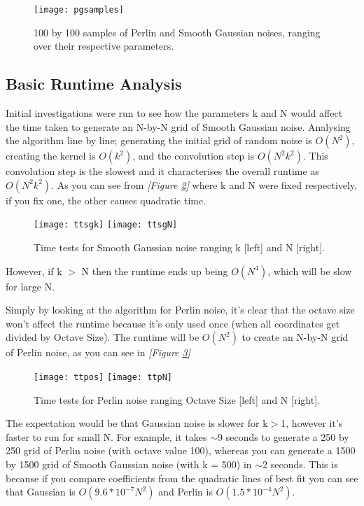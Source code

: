 \documentclass[11pt,a4paper]{article}
\begin{document}
\begin{figure}[h]
	\centering
	\texttt{[image: pgsamples]}
	\caption{100 by 100 samples of Perlin and Smooth Gaussian noises, ranging over their respective parameters.}
	\label{fig:pgsamples}
\end{figure}

\subsection{Basic Runtime Analysis}

Initial investigations were run to see how the parameters k and N would affect the time taken to generate an N-by-N grid of Smooth Gaussian noise. Analysing the algorithm line by line; generating the initial grid of random noise is $O(N^2)$, creating the kernel is $O(k^2)$, and the convolution step is $O(N^2k^2)$. This convolution step is the slowest and it characterises the overall runtime as $O(N^2k^2)$. As you can see from \emph{[Figure \ref{fig:ttsg}]} where k and N were fixed respectively, if you fix one, the other causes quadratic time.
\begin{figure}[h]
	\centering
	\texttt{[image: ttsgk]}
	\texttt{[image: ttsgN]}
	\caption{Time tests for Smooth Gaussian noise ranging k [left] and N [right].}
	\label{fig:ttsg}
\end{figure}

However, if k $>$ N then the runtime ends up being $O(N^4)$, which will be slow for large N.

Simply by looking at the algorithm for Perlin noise, it’s clear that the octave size won’t affect the runtime because it’s only used once (when all coordinates get divided by Octave Size). The runtime will be $O(N^2)$ to create an N-by-N grid of Perlin noise, as you can see in  \emph{[Figure \ref{fig:ttp}]}

\begin{figure}[h]
	\centering
	\texttt{[image: ttpos]}
	\texttt{[image: ttpN]}
	\caption{Time tests for Perlin noise ranging Octave Size [left] and N [right].}
	\label{fig:ttp}
\end{figure}

The expectation would be that Gaussian noise is slower for k$>$1, however it’s faster to run for small N. For example, it takes $\sim$9 seconds to generate a 250 by 250 grid of Perlin noise (with octave value 100), whereas you can generate a 1500 by 1500 grid of Smooth Gaussian noise (with k = 500) in $\sim$2 seconds. This is because if you compare coefficients from the quadratic lines of best fit you can see that Gaussian is $O(9.6*10^{-7} N^2)$ and Perlin is $O(1.5*10^{-4}N^2)$.
\end{document}
